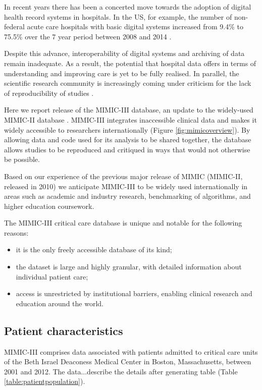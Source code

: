 \documentclass[english]{article}
\begin{document}
In recent years there has been a concerted move towards the adoption of digital health record systems in hospitals. In the US, for example, the number of non-federal acute care hospitals with basic digital systems increased from 9.4\% to 75.5\% over the 7 year period between 2008 and 2014 \cite{cite1}.

Despite this advance, interoperability of digital systems and archiving of data remain inadequate. As a result, the potential that hospital data offers in terms of understanding and improving care is yet to be fully realised. In parallel, the scientific research community is increasingly coming under criticism for the lack of reproducibility of studies \cite{cite2}.

Here we report release of the MIMIC-III database, an update to the widely-used MIMIC-II database \cite{cite3}. MIMIC-III integrates inaccessible clinical data and makes it widely accessible to researchers internationally (Figure \ref{fig:mimicoverview}). By allowing data and code used for its analysis to be shared together, the database allows studies to be reproduced and critiqued in ways that would not otherwise be possible. 

Based on our experience of the previous major release of MIMIC (MIMIC-II, released in 2010) we anticipate MIMIC-III to be widely used internationally in areas such as academic and industry research, benchmarking of algorithms, and higher education coursework.

The MIMIC-III critical care database is unique and notable for the following reasons: 
\begin{itemize}
  \item it is the only freely accessible database of its kind;
  \item the dataset is large and highly granular, with detailed information about individual patient care;
  \item access is unrestricted by institutional barriers, enabling clinical research and education around the world.
\end{itemize}

\subsection*{Patient characteristics}

MIMIC-III comprises data associated with patients admitted to critical care units of the Beth Israel Deaconess Medical Center in Boston, Massachusetts, between 2001 and 2012. The data...describe the details after generating table (Table \ref{table:patientpopulation}).
\end{document}
